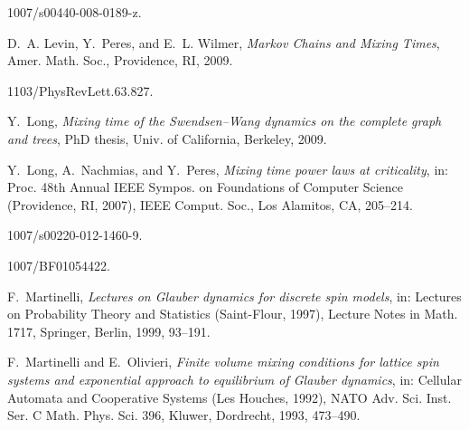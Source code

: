 \documentclass{dis}
\theoremstyle{citing}
\begin{document}
\begin{thebibliography}{10}
{\leavevmode{}1007/s00440-008-0189-z}.
\goodbreak

D.~A. Levin, Y.~Peres, and E.~L. Wilmer,
{\em Markov Chains and Mixing Times},
Amer. Math. Soc., Providence, RI, 2009.

{\leavevmode{}1103/PhysRevLett.63.827}.

Y.~{Long},
{\em Mixing time of the {S}wendsen--{W}ang dynamics on the complete graph
and trees},
PhD thesis, Univ. of California, Berkeley, 2009.

Y.~Long, A.~Nachmias, and Y.~Peres,
{\em Mixing time power laws at criticality},
in: Proc. 48th Annual IEEE Sympos. on Foundations
of Computer Science (Providence, RI, 2007), IEEE Comput. Soc., Los Alamitos, CA, 205--214.

{\leavevmode{}1007/s00220-012-1460-9}.

{\leavevmode{}1007/BF01054422}.

F.~Martinelli,
{\em Lectures on {G}lauber dynamics for discrete spin models},
in: Lectures on Probability Theory and Statistics
({S}aint-{F}lour, 1997),
Lecture Notes in Math. {1717},  Springer, Berlin, 1999, 93--191.

F.~Martinelli and E.~Olivieri,
{\em Finite volume mixing conditions for lattice spin systems and
exponential approach to equilibrium of {G}lauber dynamics},
in: Cellular Automata and Cooperative Systems ({L}es {H}ouches,
1992),
NATO Adv. Sci. Inst. Ser. C Math. Phys. Sci. {396}, Kluwer, Dordrecht, 1993, 473--490.


\end{thebibliography}
\end{document}
